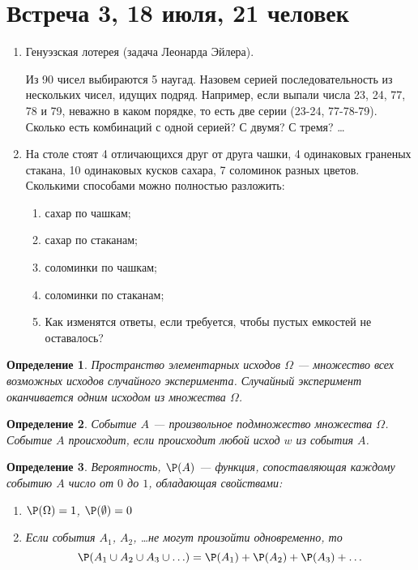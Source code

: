 \documentclass[pdftex,12pt,a4paper]{article}
\newtheorem*{defin}{Определение}
\begin{document}
\newpage
\section{Встреча 3, 18 июля, 21 человек}

\begin{enumerate}
\item Генуэзская лотерея (задача Леонарда Эйлера).

Из 90 чисел выбираются 5 наугад. Назовем серией последовательность
из нескольких чисел, идущих подряд. Например, если выпали числа
23, 24, 77, 78 и 79, неважно в каком порядке, то есть две серии
(23-24, 77-78-79). Сколько есть комбинаций с одной серией? С двумя? С тремя? \ldots 

\item На столе стоят 4 отличающихся друг от друга чашки, 4 одинаковых граненых стакана, 10 одинаковых кусков сахара, 7 соломинок разных цветов. Сколькими способами можно полностью разложить: 
\begin{enumerate}
\item сахар по чашкам;
\item сахар по стаканам;
\item соломинки по чашкам;
\item соломинки по стаканам;
\item Как изменятся ответы, если требуется, чтобы пустых емкостей не
оставалось?
\end{enumerate}

\end{enumerate}

\begin{defin}
Пространство элементарных исходов $\Omega$ --- множество всех возможных исходов случайного эксперимента. Случайный эксперимент оканчивается одним исходом из множества $\Omega$.
\end{defin}

\begin{defin}
Событие $A$ --- произвольное подмножество множества $\Omega$. Событие $A$ происходит, если происходит любой исход $w$ из события $A$.
\end{defin}

\begin{defin}
Вероятность, $\P(A)$ --- функция, сопоставляющая каждому событию $A$ число от $0$ до $1$, обладающая свойствами:
\begin{enumerate}
\item $\P(\Omega)=1$, $\P(\emptyset)=0$
\item Если события $A_1$, $A_2$, \ldots не могут произойти одновременно, то 
\[
\P(A_1 \cup A_2 \cup A_3 \cup \ldots )=\P(A_1)+\P(A_2)+\P(A_3)+\ldots
\]
\end{enumerate}

\end{defin}
\end{document}
